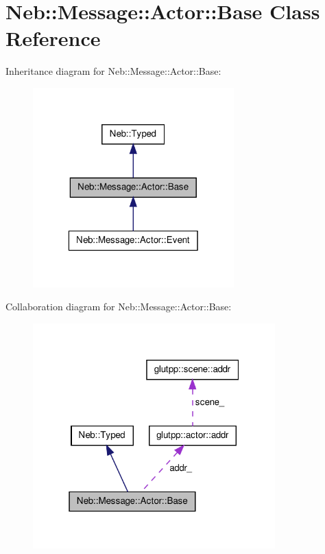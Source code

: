 \hypertarget{classNeb_1_1Message_1_1Actor_1_1Base}{\section{\-Neb\-:\-:\-Message\-:\-:\-Actor\-:\-:\-Base \-Class \-Reference}
\label{classNeb_1_1Message_1_1Actor_1_1Base}
}


\-Inheritance diagram for \-Neb\-:\-:\-Message\-:\-:\-Actor\-:\-:\-Base\-:\nopagebreak
\begin{figure}[H]
\begin{center}
\leavevmode
\includegraphics[width=220pt]{classNeb_1_1Message_1_1Actor_1_1Base__inherit__graph}
\end{center}
\end{figure}


\-Collaboration diagram for \-Neb\-:\-:\-Message\-:\-:\-Actor\-:\-:\-Base\-:\nopagebreak
\begin{figure}[H]
\begin{center}
\leavevmode
\includegraphics[width=265pt]{classNeb_1_1Message_1_1Actor_1_1Base__coll__graph}
\end{center}
\end{figure}
